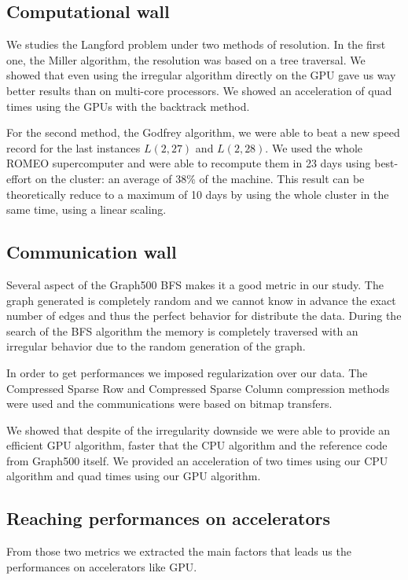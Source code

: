\subsection{Computational wall}
We studies the Langford problem under two methods of resolution. 
In the first one, the Miller algorithm, the resolution was based on a tree traversal. 
We showed that even using the irregular algorithm directly on the GPU gave us way better results than on multi-core processors. 
We showed an acceleration of quad times using the GPUs with the backtrack method.

For the second method, the Godfrey algorithm, we were able to beat a new speed record for the last instances $L(2,27)$ and $L(2,28)$.
We used the whole ROMEO supercomputer and were able to recompute them in 23 days using best-effort on the cluster: an average of 38\% of the machine.
This result can be theoretically reduce to a maximum of 10 days by using the whole cluster in the same time, using a linear scaling. 

\subsection{Communication wall}
Several aspect of the Graph500 BFS makes it a good metric in our study. 
The graph generated is completely random and we cannot know in advance the exact number of edges and thus the perfect behavior for distribute the data. 
During the search of the BFS algorithm the memory is completely traversed with an irregular behavior due to the random generation of the graph. 

In order to get performances we imposed regularization over our data.
The Compressed Sparse Row and Compressed Sparse Column compression methods were used and the communications were based on bitmap transfers. 

We showed that despite of the irregularity downside we were able to provide an efficient GPU algorithm, faster that the CPU algorithm and the reference code from Graph500 itself.
We provided an acceleration of two times using our CPU algorithm and quad times using our GPU algorithm.\\

\subsection{Reaching performances on accelerators}
From those two metrics we extracted the main factors that leads us the performances on accelerators like GPU. 
